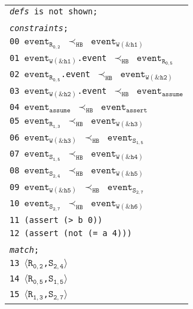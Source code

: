 \newsavebox{\boxSMTa}
\begin{lrbox}{\boxSMTa}
\normalsize
\begin{tabular}[c]{l}
\texttt{\textit{defs} is not shown;}\\
\\
\texttt{\textit{constraints};}\\
\texttt{00 $\mathtt{event_{R_{0,2}}}$ $\mathtt{\prec_{HB}}$ $\mathtt{event_{W(\&h1)}}$}\\
\texttt{01 $\mathtt{event_{W(\&h1)}}$.event $\mathtt{\prec_{HB}}$ $\mathtt{event_{R_{0,5}}}$}\\
\texttt{02 $\mathtt{event_{R_{0,5}}}$.event $\mathtt{\prec_{HB}}$ $\mathtt{event_{W(\&h2)}}$}\\
\texttt{03 $\mathtt{event_{W(\&h2)}}$.event $\mathtt{\prec_{HB}}$ $\mathtt{event_{assume}}$}\\
\texttt{04 $\mathtt{event_{assume}}$ $\mathtt{\prec_{HB}}$ $\mathtt{event_{assert}}$}\\
\texttt{05 $\mathtt{event_{R_{1,3}}}$ $\mathtt{\prec_{HB}}$ $\mathtt{event_{W(\&h3)}}$}\\
\texttt{06 $\mathtt{event_{W(\&h3)}}$ $\mathtt{\prec_{HB}}$ $\mathtt{event_{S_{1,5}}}$}\\
\texttt{07 $\mathtt{event_{S_{1,5}}}$ $\mathtt{\prec_{HB}}$ $\mathtt{event_{W(\&h4)}}$}\\
\texttt{08 $\mathtt{event_{S_{2,4}}}$ $\mathtt{\prec_{HB}}$ $\mathtt{event_{W(\&h5)}}$}\\
\texttt{09 $\mathtt{event_{W(\&h5)}}$ $\mathtt{\prec_{HB}}$ $\mathtt{event_{S_{2,7}}}$}\\
\texttt{10 $\mathtt{event_{S_{2,7}}}$ $\mathtt{\prec_{HB}}$ $\mathtt{event_{W(\&h6)}}$}\\
\texttt{11 (assert (> b 0))}\\
\texttt{12 (assert (not (= a 4)))}\\
\\
\texttt{\textit{match};}\\
\texttt{13 $\langle\mathtt{R_{0,2}}$,$\mathtt{S_{2,4}}\rangle$}\\
\texttt{14 $\langle\mathtt{R_{0,5}}$,$\mathtt{S_{1,5}}\rangle$}\\
\texttt{15 $\langle\mathtt{R_{1,3}}$,$\mathtt{S_{2,7}}\rangle$}\\

\end{tabular}
\end{lrbox}

